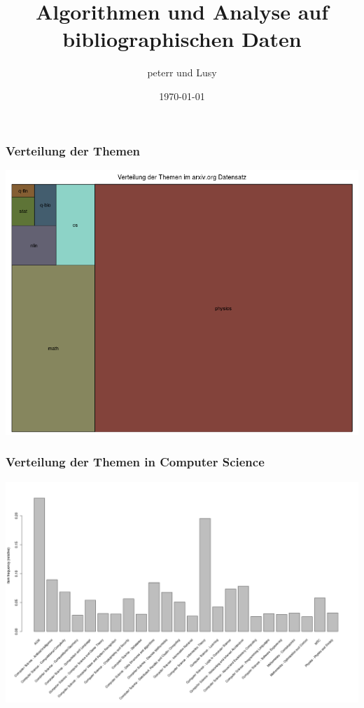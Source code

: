 \documentclass[12pt, xcolor=table]{beamer}
\begin{document}
\title{Algorithmen und Analyse auf bibliographischen Daten}   
\author{peterr und Lusy} 
\date{\today} 

\begin{frame}
	\titlepage
\end{frame}

\begin{frame}
	\frametitle{Verteilung der Themen}
	\begin{center}
		\includegraphics[scale=0.35]{../../visual/treeParent2.png}
	\end{center}
\end{frame}
\begin{frame}
	\frametitle{Verteilung der Themen in Computer Science}
	\begin{center}
		\includegraphics[scale=0.25]{../../visual/csFrequent_filter_acm_and_msc.png}
	\end{center}
\end{frame}
\end{document}
